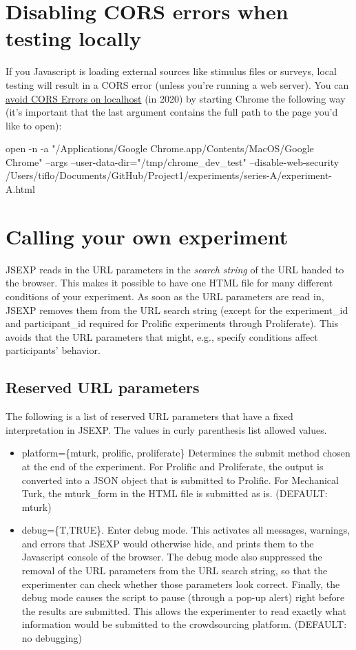 \documentclass{article}
\newenvironment{code}%
   {\par\noindent\adjustbox{margin=1ex,bgcolor=shadecolor,margin=0ex \medskipamount}\bgroup\minipage\linewidth\codewrap}%
   {\endcodewrap\endminipage\egroup}
\begin{document}
\section{Disabling CORS errors when testing locally}
If you Javascript is loading external sources like stimulus files or surveys, local testing will result in a CORS error (unless you're running a web server). You can \href{https://medium.com/swlh/avoiding-cors-errors-on-localhost-in-2020-5a656ed8cefa}{avoid CORS Errors on localhost} (in 2020) by starting Chrome the following way (it's important that the last argument contains the full path to the page you'd like to open):

\begin{code}
open -n -a "/Applications/Google Chrome.app/Contents/MacOS/Google Chrome" --args --user-data-dir="/tmp/chrome_dev_test" --disable-web-security /Users/tiflo/Documents/GitHub/Project1/experiments/series-A/experiment-A.html
\end{code}


\section{Calling your own experiment}
JSEXP reads in the URL parameters in the {\em search string} of the URL handed to the browser. This makes it possible to have one HTML file for many different conditions of your experiment. As soon as the URL parameters are read in, JSEXP removes them from the URL search string (except for the experiment\_id and participant\_id required for Prolific experiments through Proliferate). This avoids that the URL parameters that might, e.g., specify conditions affect participants' behavior. 

\subsection{Reserved URL parameters}
The following is a list of reserved URL parameters that have a fixed interpretation in JSEXP. The values in curly parenthesis list allowed values.

\begin{itemize}
    \item platform=\{mturk, prolific, proliferate\} Determines the submit method chosen at the end of the experiment. For Prolific and Proliferate, the output is converted into a JSON object that is submitted to Prolific. For Mechanical Turk, the mturk\_form in the HTML file is submitted as is. (DEFAULT: mturk)
    \item debug=\{T,TRUE\}. Enter debug mode. This activates all messages, warnings, and errors that JSEXP would otherwise hide, and prints them to the Javascript console of the browser. The debug mode also suppressed the removal of the URL parameters from the URL search string, so that the experimenter can check whether those parameters look correct. Finally, the debug mode causes the script to pause (through a pop-up alert) right before the results are submitted. This allows the experimenter to read exactly what information would be submitted to the crowdsourcing platform. (DEFAULT: no debugging)
 \end{itemize}
\end{document}
